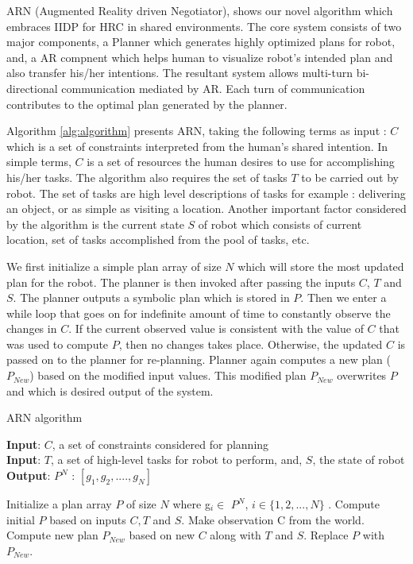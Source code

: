 \documentclass{article}
\begin{document}
ARN (Augmented Reality driven Negotiator), shows our novel algorithm which embraces IIDP for HRC in shared environments. The core system consists of two major components, a Planner which generates highly optimized plans for robot, and, a AR compnent which helps human to visualize robot's intended plan and also transfer his/her intentions. The resultant system allows multi-turn bi-directional communication mediated by AR. Each turn of communication contributes to the optimal plan generated by the planner.

Algorithm \ref{alg:algorithm} presents ARN, taking the following terms as input : $C$ which is a set of constraints interpreted from the human's shared intention. In simple terms, $C$ is a set of resources the human desires to use for accomplishing his/her tasks. The algorithm also requires the set of tasks $T$ to be carried out by robot. The set of tasks are high level descriptions of tasks for example : delivering an object, or as simple as visiting a location. Another important factor considered by the algorithm is the current state $S$ of robot which consists of current location, set of tasks accomplished from the pool of tasks, etc. 

We first initialize a simple plan array of size $N$ which will store the most updated plan for the robot. The planner is then invoked after passing the inputs $C$, $T$ and $S$. The planner outputs a symbolic plan which is stored in $P$. Then we enter a while loop that goes on for indefinite amount of time to constantly observe the changes in $C$. If the current observed value is consistent with the value of $C$ that was used to compute $P$, then no changes takes place. Otherwise, the updated $C$ is passed on to the planner for re-planning. Planner again computes a new plan ($P_{New}$) based on the modified input values. This modified plan $P_{New}$ overwrites $P$ and which is desired output of the system.


\begin{algorithm}[H]
\caption{ARN algorithm}
\label{alg:algorithm}
\textbf{Input}: $C$, a set of constraints considered for planning\\
\textbf{Input}: $T$, a set of high-level tasks for robot to perform, and, $S$, the state of robot \\
\textbf{Output}: $P^{N}$ : $[g_{1},g_{2},....,g_{N}]$
\begin{algorithmic}[1] %
\STATE Initialize a plan array $P$ of size $N$ where g$_{i}$$\in$ $P^{N}$,  $i\in \{1,2,...,N\}$ .
\STATE Compute initial $P$ based on inputs $C, T $ and $S$.
\STATE Make observation C from the world.
\STATE Compute new plan $P_{New}$ based on new $C$ along with $T$ and $S$.
\STATE Replace $P$ with $P_{New}$.
\ENDIF
\ENDWHILE
\end{algorithmic}
\end{algorithm}
\end{document}
